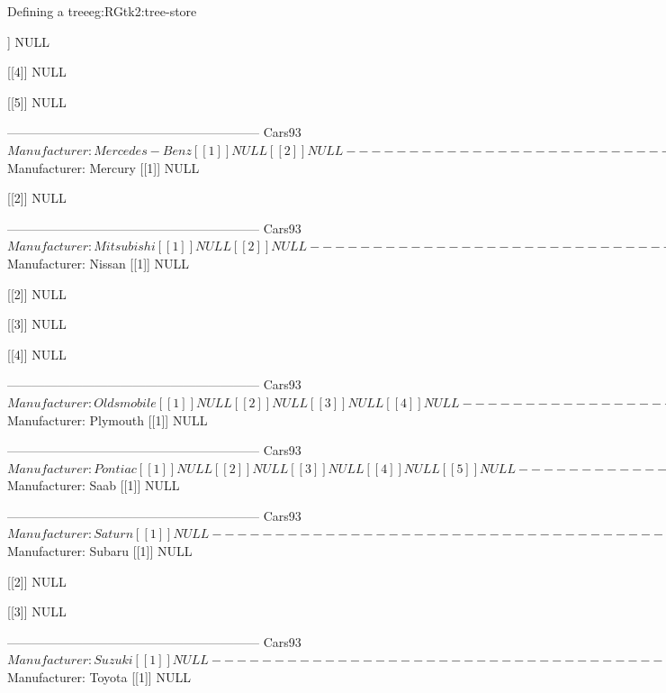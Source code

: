 \begin{example}{Defining a tree}{eg:RGtk2:tree-store}
\begin{Schunk}
\begin{Soutput}
[[3]]
NULL

[[4]]
NULL

[[5]]
NULL

------------------------------------------------------------ 
Cars93$Manufacturer: Mercedes-Benz
[[1]]
NULL

[[2]]
NULL

------------------------------------------------------------ 
Cars93$Manufacturer: Mercury
[[1]]
NULL

[[2]]
NULL

------------------------------------------------------------ 
Cars93$Manufacturer: Mitsubishi
[[1]]
NULL

[[2]]
NULL

------------------------------------------------------------ 
Cars93$Manufacturer: Nissan
[[1]]
NULL

[[2]]
NULL

[[3]]
NULL

[[4]]
NULL

------------------------------------------------------------ 
Cars93$Manufacturer: Oldsmobile
[[1]]
NULL

[[2]]
NULL

[[3]]
NULL

[[4]]
NULL

------------------------------------------------------------ 
Cars93$Manufacturer: Plymouth
[[1]]
NULL

------------------------------------------------------------ 
Cars93$Manufacturer: Pontiac
[[1]]
NULL

[[2]]
NULL

[[3]]
NULL

[[4]]
NULL

[[5]]
NULL

------------------------------------------------------------ 
Cars93$Manufacturer: Saab
[[1]]
NULL

------------------------------------------------------------ 
Cars93$Manufacturer: Saturn
[[1]]
NULL

------------------------------------------------------------ 
Cars93$Manufacturer: Subaru
[[1]]
NULL

[[2]]
NULL

[[3]]
NULL

------------------------------------------------------------ 
Cars93$Manufacturer: Suzuki
[[1]]
NULL

------------------------------------------------------------ 
Cars93$Manufacturer: Toyota
[[1]]
NULL


\end{Soutput}
\end{Schunk}
\end{example}
